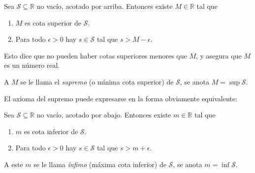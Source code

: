   \begin{axiom}[Supremo]
    \label{Re:supremo}
    Sea \(\mathcal{S} \subseteq \mathbb{R}\) no vacío,
    acotado por arriba.
    Entonces existe \(M \in \mathbb{R}\) tal que
    \begin{enumerate}[label=(\alph{*})]
    \item
      \(M\) es cota superior de \(\mathcal{S}\).
    \item
      Para todo \(\epsilon > 0\) hay \(s \in \mathcal{S}\)
      tal que \(s > M - \epsilon\).
    \end{enumerate}
  \end{axiom}
  Esto dice que no pueden haber cotas superiores menores que \(M\),
  y asegura que \(M\) es un número real.
  \begin{definition}
    A \(M\) se le llama el \emph{supremo}
    (o mínima cota superior)
    de \(\mathcal{S}\),
    se anota \(M = \sup \mathcal{S}\).
  \end{definition}
  El axioma del supremo puede expresarse en la forma obviamente equivalente:
  \begin{axiom}[Ínfimo]
    \label{Re:infimo}
    Sea \(\mathcal{S} \subseteq \mathbb{R}\) no vacío,
    acotado por abajo.
    Entonces existe \(m \in \mathbb{R}\) tal que
    \begin{enumerate}[label=(\alph{*})]
    \item
      \(m\) es cota inferior de \(\mathcal{S}\).
    \item
      Para todo \(\epsilon > 0\) hay \(s \in \mathcal{S}\)
      tal que \(s > m + \epsilon\).
    \end{enumerate}
  \end{axiom}
  \begin{definition}
    A este \(m\) se le llama \emph{ínfimo}
    (máxima cota inferior)
    de \(\mathcal{S}\),
    se anota \mbox{\(m = \inf \mathcal{S}\)}.
  \end{definition}

